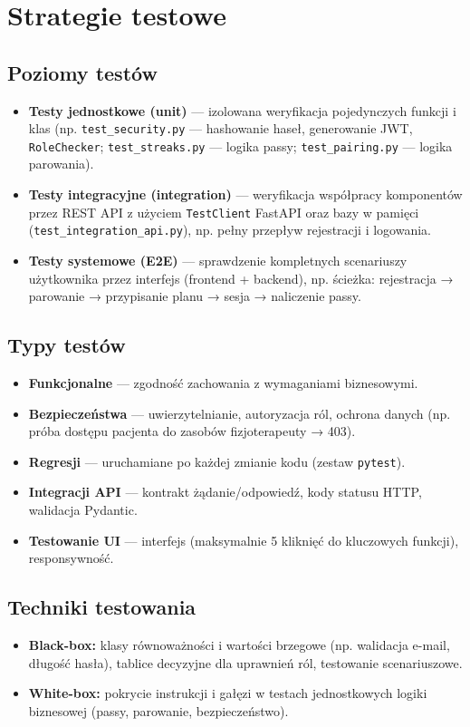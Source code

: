 \documentclass[11pt,a4paper]{article}
\begin{document}
\section{Strategie testowe}

\subsection{Poziomy testów}
\begin{itemize}
  \item \textbf{Testy jednostkowe (unit)} — izolowana weryfikacja pojedynczych funkcji i klas (np. \texttt{test\_security.py} — hashowanie haseł, generowanie JWT, \texttt{RoleChecker}; \texttt{test\_streaks.py} — logika passy; \texttt{test\_pairing.py} — logika parowania).
  \item \textbf{Testy integracyjne (integration)} — weryfikacja współpracy komponentów przez REST API z użyciem \texttt{TestClient} FastAPI oraz bazy w pamięci (\texttt{test\_integration\_api.py}), np. pełny przepływ rejestracji i logowania.
  \item \textbf{Testy systemowe (E2E)} — sprawdzenie kompletnych scenariuszy użytkownika przez interfejs (frontend + backend), np. ścieżka: rejestracja → parowanie → przypisanie planu → sesja → naliczenie passy.
\end{itemize}

\subsection{Typy testów}
\begin{itemize}
  \item \textbf{Funkcjonalne} — zgodność zachowania z wymaganiami biznesowymi.
  \item \textbf{Bezpieczeństwa} — uwierzytelnianie, autoryzacja ról, ochrona danych (np. próba dostępu pacjenta do zasobów fizjoterapeuty → 403).
  \item \textbf{Regresji} — uruchamiane po każdej zmianie kodu (zestaw \texttt{pytest}).
  \item \textbf{Integracji API} — kontrakt żądanie/odpowiedź, kody statusu HTTP, walidacja Pydantic.
  \item \textbf{Testowanie UI} — interfejs (maksymalnie 5 kliknięć do kluczowych funkcji), responsywność.
\end{itemize}

\subsection{Techniki testowania}
\begin{itemize}
  \item \textbf{Black-box:} klasy równoważności i wartości brzegowe (np. walidacja e-mail, długość hasła), tablice decyzyjne dla uprawnień ról, testowanie scenariuszowe.
  \item \textbf{White-box:} pokrycie instrukcji i gałęzi w testach jednostkowych logiki biznesowej (passy, parowanie, bezpieczeństwo).
\end{itemize}
\end{document}
